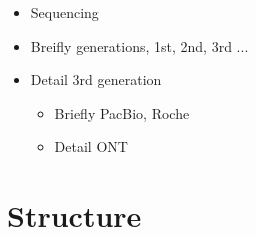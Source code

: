 \begin{itemize}
    \item Sequencing
    \item Breifly generations, 1st, 2nd, 3rd ...
    \item Detail 3rd generation
    \begin{itemize}
        \item Briefly PacBio, Roche
        \item Detail ONT
    \end{itemize}
\end{itemize}

\section{Structure}
\label{sec:intro:structure}



